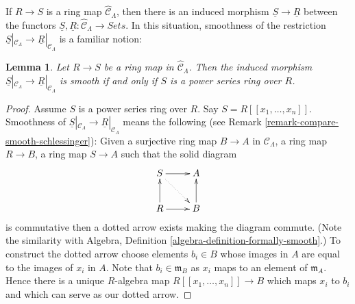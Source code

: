 \documentclass{stacks-project}
\theoremstyle{plain}
\newtheorem{lemma}[subsection]{Lemma}
\theoremstyle{definition}
\theoremstyle{remark}
\numberwithin{equation}{subsection}
\begin{document}
\noindent
If $R \to S$ is a ring map $\widehat{\mathcal{C}}_\Lambda$, then there
is an induced morphism $\underline{S} \to \underline{R}$ between the
functors $\underline{S}, \underline{R}: \widehat{\mathcal{C}}_\Lambda
\to \textit{Sets}$.  In this situation, smoothness of the
restriction $\underline{S}|_{\mathcal{C}_\Lambda} \to
\underline{R}|_{\mathcal{C}_\Lambda}$ is a familiar notion:

\begin{lemma}
\label{lemma-smooth-morphism-power-series}
Let $R \to S$ be a ring map in $\widehat{\mathcal{C}}_\Lambda$. Then
the induced morphism
$\underline{S}|_{\mathcal{C}_\Lambda} \to \underline{R}|_{\mathcal{C}_\Lambda}$
is smooth if and only if $S$ is a power series ring over $R$.
\end{lemma}

\begin{proof}
Assume $S$ is a power series ring over $R$. Say $S = R[[x_1, \ldots, x_n]]$.
Smoothness of
$\underline{S}|_{\mathcal{C}_\Lambda} \to \underline{R}|_{\mathcal{C}_\Lambda}$
means the following (see Remark \ref{remark-compare-smooth-schlessinger}):
Given a surjective ring map $B \to A$ in
$\mathcal{C}_\Lambda$, a ring map $R \to B$, a ring map $S \to A$ such that
the solid diagram
$$
\xymatrix{
S \ar[r] \ar@{..>}[rd] & A \\
R \ar[u] \ar[r] & B \ar[u]
}
$$
is commutative then a dotted arrow exists making the diagram commute.
(Note the similarity with
Algebra, Definition \ref{algebra-definition-formally-smooth}.)
To construct the dotted arrow choose elements $b_i \in B$ whose images
in $A$ are equal to the images of $x_i$ in $A$. Note that
$b_i \in \mathfrak m_B$ as $x_i$ maps to an element of $\mathfrak m_A$.
Hence there is a unique $R$-algebra map $R[[x_1, \ldots, x_n]] \to B$
which maps $x_i$ to $b_i$ and which can serve as our dotted arrow.


\end{proof}
\end{document}
